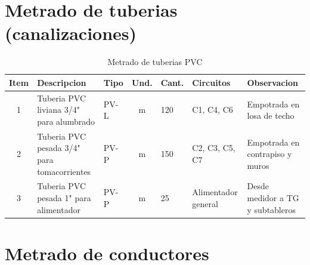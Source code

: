 \section{Metrado de tuberias (canalizaciones)}

\begin{landscape}
\begin{table}[H]
\centering
\small
\caption{Metrado de tuberias PVC}
\label{tab:metrado-tuberias}
\begin{tabularx}{\textwidth}{c L{4.5cm} L{1.5cm} c L{1.8cm} L{3.5cm} Y}
\toprule
\textbf{Item} & \textbf{Descripcion} & \textbf{Tipo} & \textbf{Und.} & \textbf{Cant.} & \textbf{Circuitos} & \textbf{Observacion} \\
 & Tuberia PVC liviana 3/4" para alumbrado & PV-L & m & 120 & C1, C4, C6 & Empotrada en losa de techo \\
2 & Tuberia PVC pesada 3/4" para tomacorrientes & PV-P & m & 150 & C2, C3, C5, C7 & Empotrada en contrapiso y muros \\
3 & Tuberia PVC pesada 1" para alimentador & PV-P & m & 25 & Alimentador general & Desde medidor a TG y subtableros \\
\bottomrule
\end{tabularx}
\end{table}
\end{landscape}

\section{Metrado de conductores}

